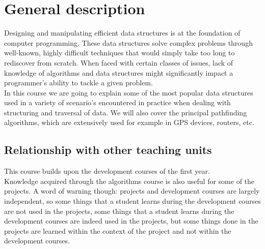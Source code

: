 \section{General description}
	Designing and manipulating efficient data structures is at the foundation of computer programming. 
	These data structures solve complex problems through well-known, highly difficult techniques that would simply take too long to rediscover from scratch. When faced with certain classes of issues, lack of knowledge of algorithms and data structures might significantly impact a programmer's ability to tackle a given problem. \\	
	In this course we are going to explain some of the most popular data structures used in a variety of scenario's encountered in practice when dealing with structuring and traversal of data. 
	We will also cover the principal pathfinding algorithms, which are extensively used for example in GPS devices, routers, etc.  \\

	\subsection{Relationship with other teaching units}
		This course builds upon the development courses of the first year.	\\		
		
		Knowledge acquired through the algorithms course is also useful for some of the projects. A word of warning though: projects and development courses are largely independent, so some things that a student learns during the development courses are not used in the projects, some things that a student learns during the development courses are indeed used in the projects, but some things done in the projects are learned within the context of the project and not within the development courses.
